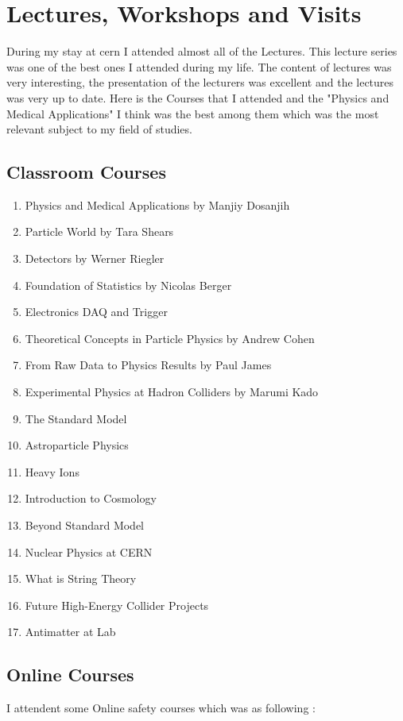 \documentclass{article}
\begin{document}
\section{Lectures, Workshops and Visits}
During my stay at cern I attended almost all of the Lectures. This lecture series was one of the best ones I attended during my life. The content of lectures was very interesting, the presentation of the lecturers was excellent and the lectures was very up to date. Here is the Courses that I attended and the "Physics and Medical Applications" I think was the best among them which was the most relevant subject to my field of studies.
\subsection{Classroom Courses}

\begin{enumerate}

\item Physics and Medical Applications by Manjiy Dosanjih
\item Particle World by Tara Shears
\item Detectors by Werner Riegler
\item Foundation of Statistics by Nicolas Berger
\item Electronics DAQ and Trigger
\item Theoretical Concepts in Particle Physics by Andrew Cohen
\item From Raw Data to Physics Results by Paul James
\item Experimental Physics at Hadron Colliders by Marumi Kado
\item The Standard Model
\item Astroparticle Physics
\item Heavy Ions
\item Introduction to Cosmology
\item Beyond Standard Model
\item Nuclear Physics at CERN
\item What is String Theory
\item Future High-Energy Collider Projects
\item Antimatter at Lab

\end{enumerate}


\subsection{Online Courses}
I attendent some Online safety courses which was as following :
\end{document}
